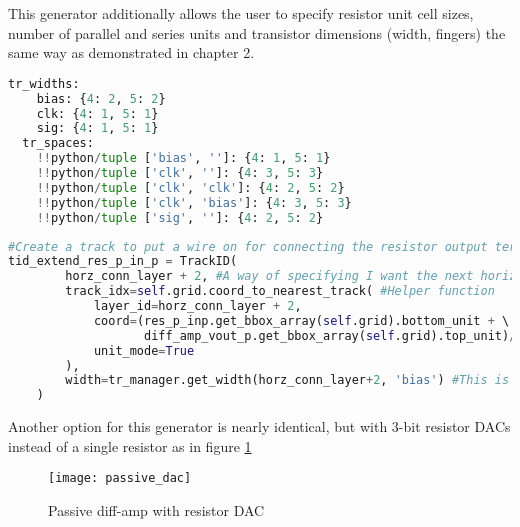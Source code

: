 This generator additionally allows the user to specify resistor unit cell sizes, number of parallel and series units and transistor dimensions (width, fingers) the same way as demonstrated in chapter 2.
\begin{lstlisting}[language=Python, caption=Track manager setup, label={lst:tr_manager}, float]
tr_widths:
    bias: {4: 2, 5: 2}
    clk: {4: 1, 5: 1}
    sig: {4: 1, 5: 1}
  tr_spaces:
    !!python/tuple ['bias', '']: {4: 1, 5: 1}
    !!python/tuple ['clk', '']: {4: 3, 5: 3}
    !!python/tuple ['clk', 'clk']: {4: 2, 5: 2}
    !!python/tuple ['clk', 'bias']: {4: 3, 5: 3}
    !!python/tuple ['sig', '']: {4: 2, 5: 2}
\end{lstlisting}
\begin{lstlisting}[language=Python, caption=Track manager usage, label={lst:wire_widths}, float]
#Create a track to put a wire on for connecting the resistor output terminal to the input terminal
tid_extend_res_p_in_p = TrackID(
        horz_conn_layer + 2, #A way of specifying I want the next horizontal layer above my lowest horizontal layer
        track_idx=self.grid.coord_to_nearest_track( #Helper function
            layer_id=horz_conn_layer + 2,
            coord=(res_p_inp.get_bbox_array(self.grid).bottom_unit + \ #This represents the coordinate of the resistor port wire
                   diff_amp_vout_p.get_bbox_array(self.grid).top_unit)/2,
            unit_mode=True
        ),
        width=tr_manager.get_width(horz_conn_layer+2, 'bias') #This is where the parametrization comes in. By changing the width corresponding to `bias' in the spec file, the width will automatically change here.
    )
\end{lstlisting}

Another option for this generator is nearly identical, but with 3-bit resistor DACs instead of a single resistor as in figure \ref{fig:passive_dac}
\begin{figure}[h]
\centering
\texttt{[image: passive\_dac]}
\caption{Passive diff-amp with resistor DAC}
\label{fig:passive_dac}
\end{figure}


